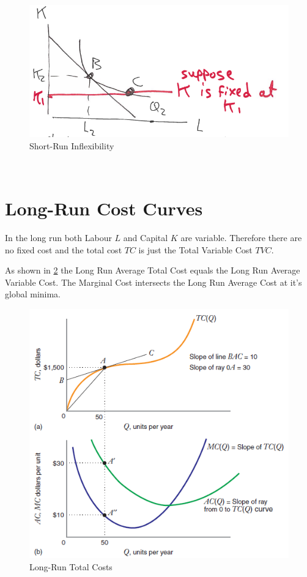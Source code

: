\documentclass[../ECON-281-Notes.tex]{subfiles}
\begin{document}
\begin{figure}[!h]
    \centering
    \includegraphics[width=\columnwidth]{../assets/SR_inflex.png}   
    \caption{Short-Run Inflexibility}
    \label{fig:SR_inflex}
\end{figure}

\newpage
~
\newpage

\section{Long-Run Cost Curves}
In the long run both Labour \(L\) and Capital \(K\) are variable. Therefore there are no fixed cost and the total cost \(TC\) is just the Total Variable Cost \(TVC\).

As shown in \cref{fig:LRTC} the Long Run Average Total Cost equals the Long Run Average Variable Cost. The Marginal Cost intersects the Long Run Average Cost at it's global  minima. 
\begin{figure}[h]
    \centering
    \includegraphics[width=\columnwidth]{../assets/LRTC.png}   
    \caption{Long-Run Total Costs}
    \label{fig:LRTC}
\end{figure}
\end{document}
